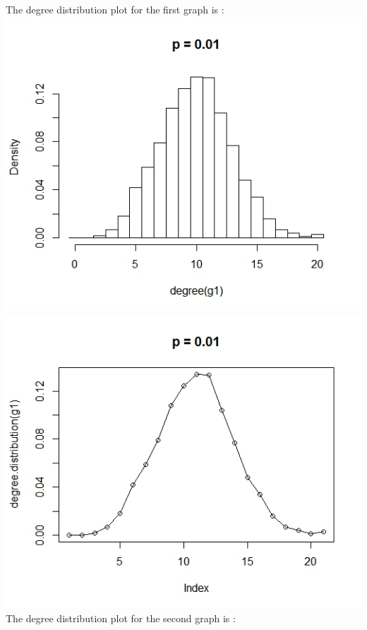 \documentclass{article}
\begin{document}
The degree distribution plot for the first graph is :\\
\includegraphics[scale=0.4]{pa1} \\
\includegraphics[scale=0.4]{pa2} \\
The degree distribution plot for the second graph is :\\
\end{document}
